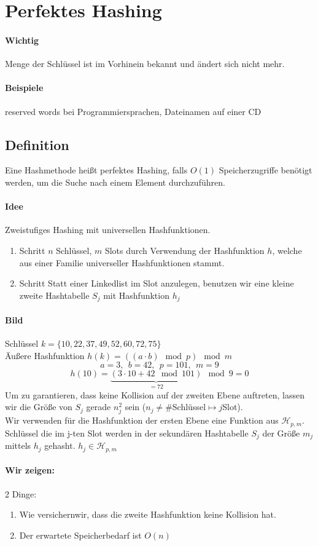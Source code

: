 \section{Perfektes Hashing}
\paragraph{Wichtig}
Menge der Schlüssel ist im Vorhinein bekannt und ändert sich nicht mehr.
\paragraph{Beispiele}
reserved words bei Programmiersprachen, Dateinamen auf einer CD
\subsection{Definition}
Eine Hashmethode heißt perfektes Hashing, falls $O(1)$ Speicherzugriffe benötigt werden, um die Suche nach einem Element durchzuführen.
\paragraph{Idee}
Zweistufiges Hashing mit universellen Hashfunktionen.
\begin{enumerate}
	\item Schritt  $n$ Schlüssel, $m$ Slots durch Verwendung der Hashfunktion $h$, welche aus einer Familie universeller Hashfunktionen stammt.
	\item Schritt  Statt einer Linkedlist im Slot anzulegen, benutzen wir eine kleine zweite Hashtabelle $S_j$ mit Hashfunktion $h_j$
\end{enumerate}
\paragraph{Bild} Schlüssel $k=\{ 10, 22, 37, 49, 52, 60, 72, 75 \}$\\
Äußere Hashfunktion $h(k)=((a\cdot b) \mod{p})\mod{m}$
\[ a=3,~~b=42,~~p=101,~~m=9 \]
\[ h(10)= \underset{=72}{ \underbrace{ (3\cdot 10+42\mod101) } }\mod{9}=0 \]
Um zu garantieren, dass keine Kollision auf der zweiten Ebene auftreten, lassen wir die Größe von $S_j$ gerade $n_j^2$ sein ($n_j\neq \#$Schlüssel$\mapsto j$Slot).\\
Wir verwenden für die Hashfunktion der ersten Ebene eine Funktion aus $\mathcal{H}_{p,m}$. Schlüssel die im j-ten Slot werden in der sekundären Hashtabelle $S_j$ der Größe $m_j$ mittels $h_j$ gehasht.  $h_j\in\mathcal{H}_{p,m}$
\paragraph{Wir zeigen:} 2 Dinge:
\begin{enumerate}
	\item Wie versichernwir, dass die zweite Hashfunktion keine Kollision hat.
	\item Der erwartete Speicherbedarf ist $O(n)$
\end{enumerate}

